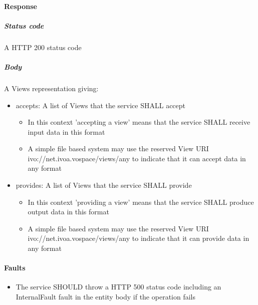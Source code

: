 \documentclass[11pt,a4paper]{ivoa}
\begin{document}
\paragraph{Response}
\subparagraph{Status code} A HTTP 200 status code
\subparagraph{Body}
A Views representation giving:
\begin{itemize}
    \item accepts: A list of Views that the service SHALL accept
    \begin{itemize}
        \item In this context 'accepting a view' means that the service SHALL receive input data in this format
        \item A simple file based system may use the reserved View URI ivo://net.ivoa.vospace/views/any to indicate that it can accept data in any format
    \end{itemize}
    \item provides: A list of Views that the service SHALL provide
    \begin{itemize}
        \item In this context 'providing a view' means that the service SHALL produce output data in this format
        \item A simple file based system may use the reserved View URI ivo://net.ivoa.vospace/views/any to indicate that it can provide data in any format
    \end{itemize}
\end{itemize}

\paragraph{Faults}
\begin{itemize}
    \item The service SHOULD throw a HTTP 500 status code including an InternalFault fault in the entity body if the operation fails
\end{itemize}
\end{document}
